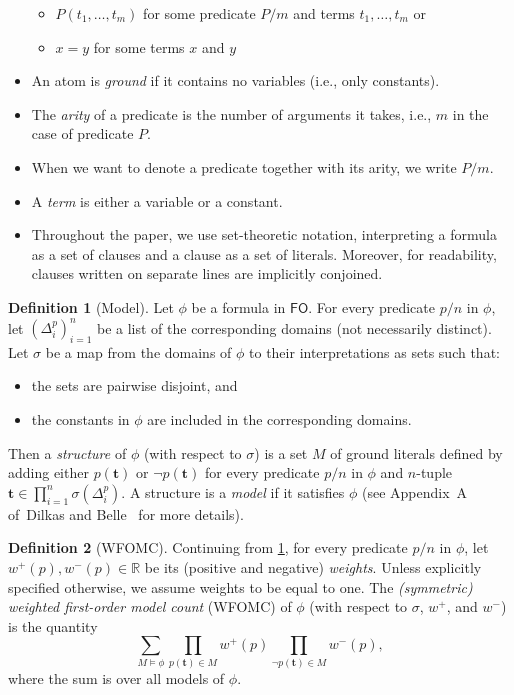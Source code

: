 \documentclass{article}
\theoremstyle{definition}
\newtheorem{definition}{Definition}
\newcommand{\FO}{$\mathsf{FO}$}
\begin{document}
\begin{itemize}
  \begin{itemize}
    \item $P(t_{1}, \dots, t_{m})$ for some predicate $P/m$ and terms
          $t_{1}, \dots, t_{m}$ or
    \item $x=y$ for some terms $x$ and $y$
  \end{itemize}
  \item An atom is \emph{ground} if it contains no variables (i.e., only
        constants).
  \item The \emph{arity} of a predicate is the number of arguments it takes,
        i.e., $m$ in the case of predicate $P$.
  \item When we want to denote a predicate together with its arity, we write
        $P/m$.
  \item A \emph{term} is either a variable or a constant.
  \item Throughout the paper, we use set-theoretic notation, interpreting a
        formula as a set of clauses and a clause as a set of literals. Moreover,
        for readability, clauses written on separate lines are implicitly
        conjoined.
\end{itemize}

\begin{definition}[Model]\label{def:model}
  Let $\phi$ be a formula in \FO{}. For every predicate $p/n$ in $\phi$, let
  ${(\Delta_{i}^{p})}_{i=1}^{n}$ be a list of the corresponding domains (not
  necessarily distinct). Let $\sigma$ be a map from the domains of $\phi$ to
  their interpretations as sets such that:
  \begin{itemize}
    \item the sets are pairwise disjoint, and
    \item the constants in $\phi$ are included in the corresponding domains.
  \end{itemize}
  Then a \emph{structure} of $\phi$ (with respect to $\sigma$) is a set $M$ of
  ground literals defined by adding either $p(\mathbf{t})$ or
  $\neg p(\mathbf{t})$ for every predicate $p/n$ in $\phi$ and $n$-tuple
  $\mathbf{t} \in \prod_{i=1}^{n} \sigma(\Delta_{i}^{p})$. A structure is a
  \emph{model} if it satisfies $\phi$ (see Appendix~A of~Dilkas and
  Belle~ for more details).
\end{definition}

\begin{definition}[WFOMC]
  Continuing from \cref{def:model}, for every predicate $p/n$ in $\phi$, let
  $w^{+}(p), w^{-}(p) \in \mathbb{R}$ be its (positive and negative)
  \emph{weights}. Unless explicitly specified otherwise, we assume weights to be
  equal to one. The \emph{(symmetric) weighted first-order model count} (WFOMC)
  of $\phi$ (with respect to $\sigma$, $w^{+}$, and $w^{-}$) is the quantity
  \[
    \sum_{M \models \phi} \prod_{p(\mathbf{t}) \in M} w^{+}(p) \prod_{\neg p(\mathbf{t}) \in M} w^{-}(p),
  \]
  where the sum is over all models of $\phi$.
\end{definition}
\end{document}
